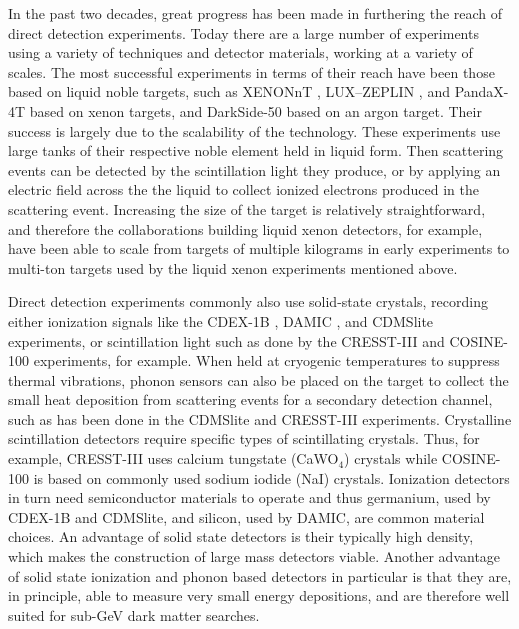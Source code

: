 \documentclass[b5paper, 10pt, twoside]{book}
\begin{document}
In the past two decades, great progress has been made in furthering the reach of direct detection experiments. Today there are a large number of experiments using a variety of techniques and detector materials, working at a variety of scales. The most successful experiments in terms of their reach have been those based on liquid noble targets, such as XENONnT \parencite{XENONnT2023}, LUX--ZEPLIN \parencite{LZ2024}, and PandaX-4T \parencite{PandaX2021} based on xenon targets, and DarkSide-50 \parencite{DarkSide2023} based on an argon target. Their success is largely due to the scalability of the technology. These experiments use large tanks of their respective noble element held in liquid form. Then scattering events can be detected by the scintillation light they produce, or by applying an electric field across the the liquid to collect ionized electrons produced in the scattering event. Increasing the size of the target is relatively straightforward, and therefore the collaborations building liquid xenon detectors, for example, have been able to scale from targets of multiple kilograms in early experiments to multi-ton targets used by the liquid xenon experiments mentioned above.

Direct detection experiments commonly also use solid-state crystals, recording either ionization signals like the CDEX-1B \parencite{CDEX2019}, DAMIC \parencite{DAMIC2020}, and CDMSlite \parencite{CDMSlite2018} experiments, or scintillation light such as done by the CRESST-III \parencite{CRESSTIII2019} and COSINE-100 \parencite{COSINE1002018} experiments, for example. When held at cryogenic temperatures to suppress thermal vibrations, phonon sensors can also be placed on the target to collect the small heat deposition from scattering events for a secondary detection channel, such as has been done in the CDMSlite and CRESST-III experiments. Crystalline scintillation detectors require specific types of scintillating crystals. Thus, for example, CRESST-III uses calcium tungstate (CaWO$_4$) crystals while COSINE-100 is based on commonly used sodium iodide (NaI) crystals. Ionization detectors in turn need semiconductor materials to operate and thus germanium, used by CDEX-1B and CDMSlite, and silicon, used by DAMIC, are common material choices. An advantage of solid state detectors is their typically high density, which makes the construction of large mass detectors viable. Another advantage of solid state ionization and phonon based detectors in particular is that they are, in principle, able to measure very small energy depositions, and are therefore well suited for sub-GeV dark matter searches.
\end{document}

